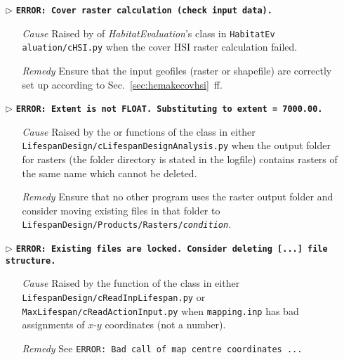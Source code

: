 \begin{itemize}
	\item[$\triangleright$]\textbf{\texttt{ERROR: Cover raster calculation (check input data).}}
	\begin{itemize}
		\item[\textit{Cause}\hspace{0.27cm}] Raised by  of \textit{HabitatEvaluation}'s  class in \texttt{HabitatEv aluation/cHSI.py} when the cover HSI raster calculation failed.
		\item[\textit{Remedy}]  Ensure that the input geofiles (raster or shapefile) are correctly set up according to  Sec.~\ref{sec:hemakecovhsi}~ff.\\
	\end{itemize}	
	
	\item[$\triangleright$]\textbf{\texttt{ERROR: Extent is not FLOAT. Substituting to extent = 7000.00.}}
	\begin{itemize}
		\item[\textit{Cause}\hspace{0.27cm}] Raised by the  or  functions of the  class in either \texttt{LifespanDesign/cLifespanDesignAnalysis.py} when the output folder for rasters (the folder directory is stated in the logfile) contains rasters of the same name which cannot be deleted.
		\item[\textit{Remedy}] Ensure that no other program uses the raster output folder and consider moving existing files in that folder to \texttt{LifespanDesign/Products/Rasters/\textit{condition}}.\\
	\end{itemize}
	
	\item[$\triangleright$]\textbf{\texttt{ERROR: Existing files are locked. Consider deleting [...] file structure.}}
	\begin{itemize}
		\item[\textit{Cause}\hspace{0.27cm}] Raised by the  function of the  class in either \texttt{LifespanDesign/cReadInpLifespan.py} or \texttt{MaxLifespan/cReadActionInput.py} when \texttt{mapping.inp} has bad assignments of $x$-$y$ coordinates (not a number).
		\item[\textit{Remedy}] See \texttt{ERROR: Bad call of map centre coordinates ... }\\
	\end{itemize}
	

\end{itemize}

